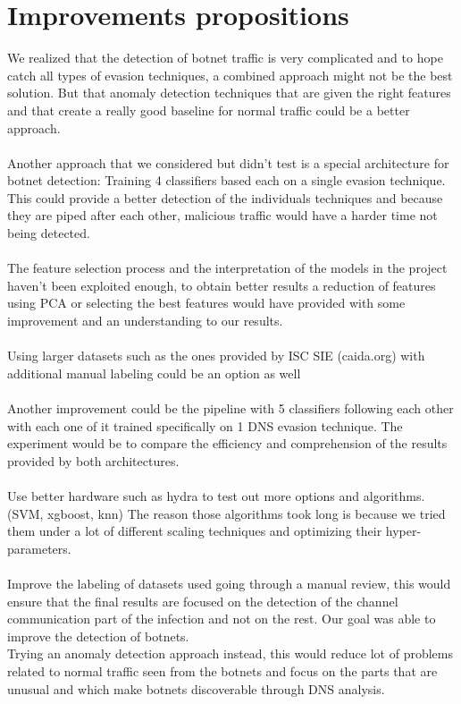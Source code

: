 \section{Improvements propositions}
We realized that the detection of botnet traffic is very complicated and to hope catch all types of evasion techniques, a combined approach might not be the best solution. But that anomaly detection techniques that are given the right features and that create a really good baseline for normal traffic could be a better approach.\\
\\
Another approach that we considered but didn't test is a special architecture for botnet detection: Training 4 classifiers based each on a single evasion technique. This could provide a better detection of the individuals techniques and because they are piped after each other, malicious traffic would have a harder time not being detected.\\
\\
The feature selection process and the interpretation of the models in the project haven't been exploited enough, to obtain better results a reduction of features using PCA or selecting the best features would have provided with some improvement and an understanding to our results.\\
\\
Using larger datasets such as the ones provided by ISC SIE (caida.org) with additional manual labeling could be an option as well\\
\\
Another improvement could be the pipeline with 5 classifiers following each other with each one of it trained specifically on 1 DNS evasion technique. The experiment would be to compare the efficiency and comprehension of the results provided by both architectures.\\
\\
Use better hardware such as hydra to test out more options and algorithms. (SVM, xgboost, knn)
The reason those algorithms took long is because we tried them under a lot of different scaling techniques and optimizing their hyper-parameters.\\
\\
Improve the labeling of datasets used going through a manual review, this would ensure that the final results are focused on the detection of the channel communication part of the infection and not on the rest. Our goal was able to improve the detection of botnets.
\\
Trying an anomaly detection approach instead, this would reduce  lot of problems related to normal traffic seen from the botnets and focus on the parts that are unusual and which make botnets discoverable through DNS analysis. 